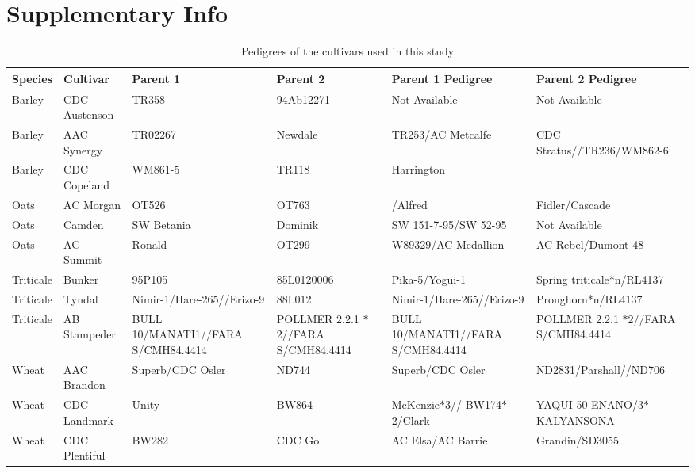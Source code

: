\documentclass[12pt, letterpaper, ]{report}
\begin{document}
\section{Supplementary Info}
\begin{landscape}
\begin{table}
        \centering
        \caption{Pedigrees of the cultivars used in this study}
        \begin{tabular}{ll>{\raggedright\arraybackslash}p{3cm}>{\raggedright\arraybackslash}p{3cm}>{\raggedright\arraybackslash}p{5cm}>{\raggedright\arraybackslash}p{4cm}}
          \toprule
          Species & Cultivar & Parent 1 & Parent 2 & Parent 1 Pedigree & Parent 2 Pedigree \\
          \midrule
          Barley & CDC Austenson & TR358 & 94Ab12271 & Not Available & Not Available \\
          Barley & AAC Synergy & TR02267 & Newdale & TR253/AC Metcalfe & CDC Stratus//TR236/WM862-6 \\
          Barley & CDC Copeland & WM861-5 & TR118 & Harrington & \\
          Oats & AC Morgan & OT526 & OT763 & 17578/Alfred & Fidler/Cascade \\
          Oats & Camden & SW Betania & Dominik & SW 151-7-95/SW 52-95 & Not Available \\
          Oats & AC Summit & Ronald & OT299 & W89329/AC Medallion & AC Rebel/Dumont 48 \\
          Triticale & Bunker & 95P105 & 85L0120006 & Pika-5/Yogui-1 & Spring triticale*n/RL4137 \\
          Triticale & Tyndal & Nimir-1/Hare-265//Erizo-9 & 88L012 & Nimir-1/Hare-265//Erizo-9 & Pronghorn*n/RL4137 \\
          Triticale & AB Stampeder & BULL 10/MANATI1//FARA S/CMH84.4414 & POLLMER 2.2.1 $\ast$2//FARA S/CMH84.4414 & BULL 10/MANATI1//FARA S/CMH84.4414 & POLLMER 2.2.1 $\ast$2//FARA S/CMH84.4414 \\
          Wheat & AAC Brandon & Superb/CDC Osler & ND744 & Superb/CDC Osler & ND2831/Parshall//ND706 \\
          Wheat & CDC Landmark & Unity & BW864 & McKenzie$\ast$3// BW174$\ast$2/Clark & YAQUI 50-ENANO/3$\ast$KALYANSONA \\
          Wheat & CDC Plentiful & BW282 & CDC Go & AC Elsa/AC Barrie & Grandin/SD3055 \\
          \bottomrule
        \end{tabular}
      \end{table}
      
      \end{landscape}
\end{document}
